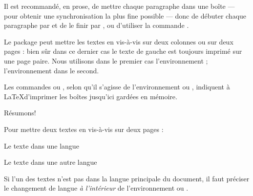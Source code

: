 Il est recommandé, en prose, de mettre chaque paragraphe dans une boîte --- pour obtenir une synchronisation la plus fine possible --- donc de débuter chaque paragraphe par  et de le finir par , ou d'utiliser la commande . 


Le package  peut mettre les textes en vis-à-vis sur deux colonnes ou sur deux pages  : bien sûr dans ce dernier  cas le texte de gauche est toujours imprimé sur une page paire.
Nous utilisons dans le premier cas l'environnement  ; l'environnement  dans le second.

Les commandes  ou , selon qu'il s'agisse de l'environnement  ou , indiquent à \LaTeX  d'imprimer les boîtes jusqu'ici gardées en mémoire. 



Résumons!

Pour mettre deux textes en vis-à-vis sur deux pages :

\begin{latexcode}

\begin{pages}  %
\begin{Leftside} %
\beginnumbering %
\pstart %
 
Le texte dans une langue 
 
\pend
\endnumbering  %
\end{Leftside} %
 
\begin{Rightside}  %
\beginnumbering
\pstart
 
Le texte dans une autre langue
 
\pend
\endnumbering
\end{Rightside} 
\Pages

\end{pages} %
\end{latexcode}

\begin{attention}
Si l'un des textes n'est pas dans la langue principale du document, il faut préciser le changement de langue \emph{à l'intérieur} de l'environnement  ou .

\begin{latexcode}
\begin{Leftside}
\begin{<langue>}
\end{<langue>}
\end{Leftside}
\end{latexcode}
\end{attention}

